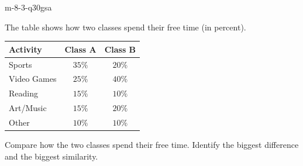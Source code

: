 \begin{practiceQuestion}{m-8-3-q30}{gsa}
\begin{questionText}
The table shows how two classes spend their free time (in percent).

\begin{center}
\begin{tabular}{|l|c|c|}
\hline
\textbf{Activity} & \textbf{Class A} & \textbf{Class B} \\
\hline
Sports & $35\%$ & $20\%$ \\
\hline
Video Games & $25\%$ & $40\%$ \\
\hline
Reading & $15\%$ & $10\%$ \\
\hline
Art/Music & $15\%$ & $20\%$ \\
\hline
Other & $10\%$ & $10\%$ \\
\hline
\end{tabular}
\end{center}

Compare how the two classes spend their free time. Identify the biggest difference and the biggest similarity.
\end{questionText}
\end{practiceQuestion}
